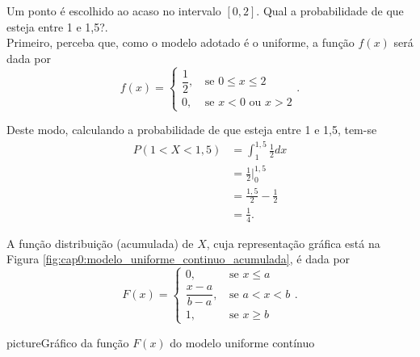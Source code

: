 \begin{example}
	\label{ex:ponto_entre_0_2}
	Um ponto é escolhido ao acaso no intervalo $[0,2]$. Qual a probabilidade de que esteja entre 1 e 1,5?.\\
	
	Primeiro, perceba que, como o modelo adotado é o uniforme, a função $f(x)$ será dada por
	\[
		f(x)=\begin{cases}
			\dfrac{1}{2}\text{,}&\text{ se }0\leqslant x\leqslant 2\\
			0\text{,}&\text{ se } x<0\text{ ou }x>2
		\end{cases}\text{.}
	\]
	
	Deste modo, calculando a probabilidade de que esteja entre 1 e 1,5, tem-se
		\begin{align*}
			P(1<X<1,5)&=\int_{1}^{1,5} \frac{1}{2} dx\\
					  &=\frac{1}{2}\Big|_{0}^{1,5}\\
					  &=\frac{1,5}{2}-\frac{1}{2}\\
					  &=\frac{1}{4}\text{.}
		\end{align*}
\end{example}

A função distribuição (acumulada) de $X$, cuja representação gráfica está na Figura \ref{fig:cap0:modelo_uniforme_continuo_acumulada}, é dada por
\[
	F(x)=\begin{cases}
		0\text{,}&\text{ se }x\leqslant a\\
		\dfrac{x-a}{b-a}\text{,}&\text{ se }a<x<b\\
		1\text{,}&\text{ se }x\geqslant b
	\end{cases}
	\text{.}
\]

\begin{sidepicture}{2cm}{picture}{Gráfico da função $F(x)$ do modelo uniforme contínuo}
	\label{fig:cap0:modelo_uniforme_continuo_acumulada}
\end{sidepicture}

